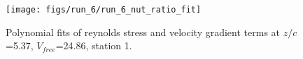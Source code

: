 \begin{figure}[H]
\centering
\texttt{[image: figs/run\_6/run\_6\_nut\_ratio\_fit]}
\caption{Polynomial fits of reynolds stress and velocity gradient terms at $z/c$=5.37, $V_{free}$=24.86, station 1.}
\label{fig:run_6_nut_ratio_fit}
\end{figure}


